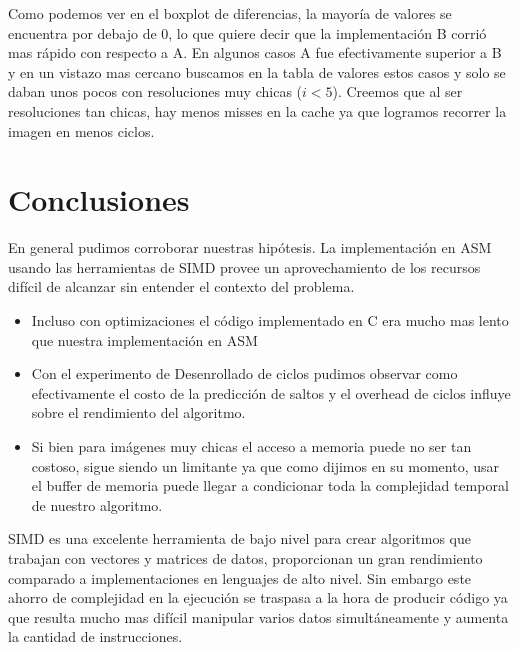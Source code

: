 \documentclass[a4paper]{article}
\begin{document}
Como podemos ver en el boxplot de diferencias, la mayoría de valores se encuentra por debajo de 0, lo que quiere decir que la implementaci\'on B corrió mas rápido con respecto a A. En algunos casos A fue efectivamente superior a B y en un vistazo mas cercano buscamos en la tabla de valores estos casos y solo se daban unos pocos con resoluciones muy chicas ($i < 5$). Creemos que al ser resoluciones tan chicas, hay menos misses en la cache ya que logramos recorrer la imagen en menos ciclos.

\section{Conclusiones}
En general pudimos corroborar nuestras hip\'otesis. La implementaci\'on en ASM usando las herramientas de SIMD provee un aprovechamiento de los recursos difícil de alcanzar sin entender el contexto del problema.


\begin{itemize}
	\item Incluso con optimizaciones el código implementado en C era mucho mas lento que nuestra implementación en ASM 
	\item Con el experimento de Desenrollado de ciclos pudimos observar como efectivamente el costo de la predicci\'on de saltos y el overhead de ciclos influye sobre el rendimiento del algoritmo.
	\item Si bien para imágenes muy chicas el acceso a memoria puede no ser tan costoso, sigue siendo un limitante ya que como dijimos en su momento, usar el buffer de memoria puede llegar a condicionar toda la complejidad temporal de nuestro algoritmo.
\end{itemize}

SIMD es una excelente herramienta de bajo nivel para crear algoritmos que trabajan con vectores y matrices de datos, proporcionan un gran rendimiento comparado a implementaciones en lenguajes de alto nivel. Sin embargo este ahorro de complejidad en la ejecución se traspasa a la hora de producir código ya que resulta mucho mas difícil manipular varios datos simultáneamente y aumenta la cantidad de instrucciones.
\end{document}
